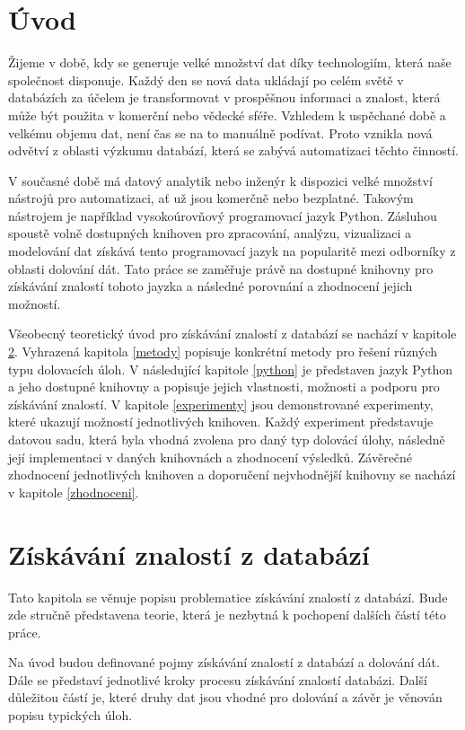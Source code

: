 \chapter{Úvod}
\label{uvod}
Žijeme v době, kdy se generuje velké množství dat díky technologiím, která naše společnost disponuje. Každý den se nová data ukládají po celém světě v databázích za účelem je transformovat v prospěšnou informaci a znalost, která může být použita v komerční nebo vědecké sféře. Vzhledem k uspěchané době a velkému objemu dat, není čas se na to manuálně podívat. Proto vznikla nová odvětví z oblasti výzkumu databází, která se zabývá automatizaci těchto činností.

V současné době má datový analytik nebo inženýr k dispozici velké množství nástrojů pro automatizaci, ať už jsou komerčně nebo bezplatné. Takovým nástrojem je například vysokoúrovňový programovací jazyk Python. Zásluhou spoustě volně dostupných knihoven pro zpracování, analýzu, vizualizaci a modelování dat získává tento programovací jazyk na popularitě mezi odborníky z oblasti dolování dát. Tato práce se zaměřuje právě na dostupné knihovny pro získávání znalostí tohoto jayzka a následné porovnání a zhodnocení jejich možností.

Všeobecný teoretický úvod pro získávání znalostí z databází se nachází v kapitole \ref{ziskavani}. Vyhrazená kapitola \ref{metody} popisuje konkrétní metody pro řešení různých typu dolovacích úloh. V následující kapitole \ref{python} je představen jazyk Python a jeho dostupné knihovny a popisuje jejich vlastnosti, možnosti a podporu pro získávání znalostí. V kapitole \ref{experimenty} jsou demonstrované experimenty, které ukazují možností jednotlivých knihoven. Každý experiment představuje datovou sadu, která byla vhodná zvolena pro daný typ dolovácí úlohy, následně její implementaci v daných knihovnách a zhodnocení výsledků. Závěrečné zhodnocení jednotlivých knihoven a doporučení nejvhodnější knihovny se nachází v kapitole \ref{zhodnoceni}.

\chapter{Získávání znalostí z databází}
\label{ziskavani}
Tato kapitola se věnuje popisu problematice získávání znalostí z databází. Bude zde stručně představena teorie, která je nezbytná k pochopení dalších částí této práce.

Na úvod budou definované pojmy získávání znalostí z databází a dolování dát. Dále se představí jednotlivé kroky procesu získávání znalostí databázi. Další důležitou částí je, které druhy dat jsou vhodné pro dolování a závěr je věnován popisu typických úloh.

